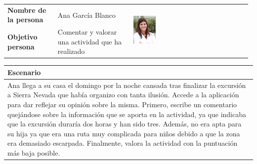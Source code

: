 \documentclass[11pt]{article}
\begin{document}
\begin{table}[H]
  \centering
  \begin{tabular}{p{0.2\linewidth}|p{0.3\linewidth}p{0.475\linewidth}}
    \toprule
    \textbf{Nombre de la persona} & Ana García Blanco &\multirow{2}{*}{\begin{minipage}{1.\textwidth}\includegraphics[width=0.2\textwidth, height=25mm]{Ana}\end{minipage}}\\
    \textbf{Objetivo persona} & Comentar y valorar una actividad que ha realizado & \\
    \bottomrule
  \end{tabular}

\begin{tabular}{p{1.028\linewidth}}
  \textbf{Escenario}\\
  \midrule
  Ana llega a su casa el domingo por la noche cansada tras finalizar la excursión a Sierra Nevada que había organizo con tanta ilusión. Accede a la aplicación para dar reflejar su opinión sobre la misma. Primero, escribe un comentario quejándose sobre la información que se aporta en la actividad, ya que indicaba que la excursión duraría dos horas y han sido tres. Además, no era apta para su hija ya que era una ruta muy complicada para niños debido a que la zona era demasiado escarpada. Finalmente, valora la actividad con la puntuación más baja posible. 
\end{tabular}
\end{table}
\end{document}
